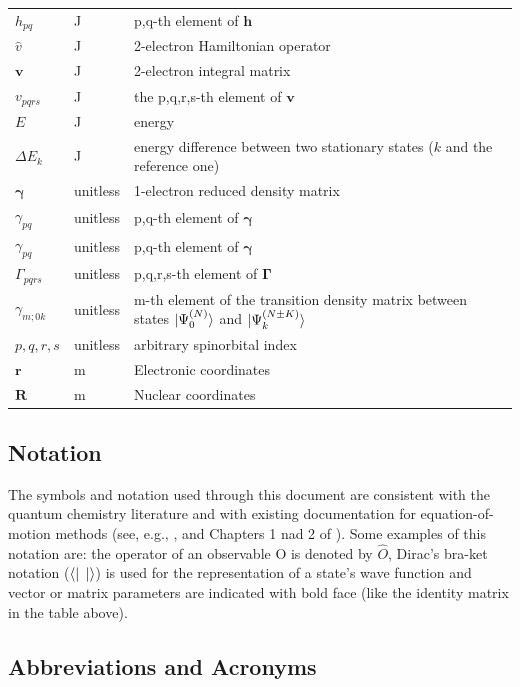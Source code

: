 \documentclass[12pt]{article}
\begin{document}
\begin{longtable*}{l l p{12cm}}
$h_{pq}$ & \si{\joule} & p,q-th element of $\mathbf{h}$\\
$\hat{v}$ & \si{\joule} & 2-electron Hamiltonian operator\\
$\mathbf{v}$ & \si{\joule} & 2-electron integral matrix\\
$v_{pqrs}$ & \si{\joule} & the p,q,r,s-th element of $\mathbf{v}$\\
$E$ & \si{\joule} & energy\\
$\Delta E_{k}$ & \si{\joule} & energy difference between two stationary 
states ($k$ and the reference one)\\
$\boldsymbol{\gamma}$ & unitless& 1-electron reduced density matrix\\
$\gamma_{pq}$ & unitless& p,q-th element of $\boldsymbol{\gamma}$\\
$\gamma_{pq}$ & unitless& p,q-th element of $\boldsymbol{\gamma}$\\
$\Gamma_{pqrs}$ & unitless& p,q,r,s-th element of $\boldsymbol{\Gamma}$\\
$\gamma_{m;0k}$ & unitless& m-th element of the transition density matrix 
between states $\ket{\Psi^{(N)}_0}$ and $\ket{\Psi^{(N \pm K)}_{k}}$\\
$p,q,r,s$ & unitless & arbitrary spinorbital index\\
$\mathbf{r}$ & \si{\metre} & Electronic coordinates\\
$\mathbf{R}$ & \si{\metre} & Nuclear coordinates\\
\bottomrule
\end{longtable*}
\subsection{Notation}
The symbols and notation used through this document are consistent with the 
quantum chemistry literature and with existing documentation for 
equation-of-motion methods (see, e.g., \cite{Pernal2018}, \cite{McKoy1977} and 
Chapters 1 nad 2 of \cite{szabo-ostlund}). Some examples of this notation are: 
the operator of an observable O is denoted by $\hat{O}$, Dirac's bra-ket 
notation ($\bra{}$ $\ket{}$) is used for the representation of a state's wave 
function and vector or matrix parameters are indicated with bold face (like the 
identity matrix in the table above).


\subsection{Abbreviations and Acronyms}
\end{document}
